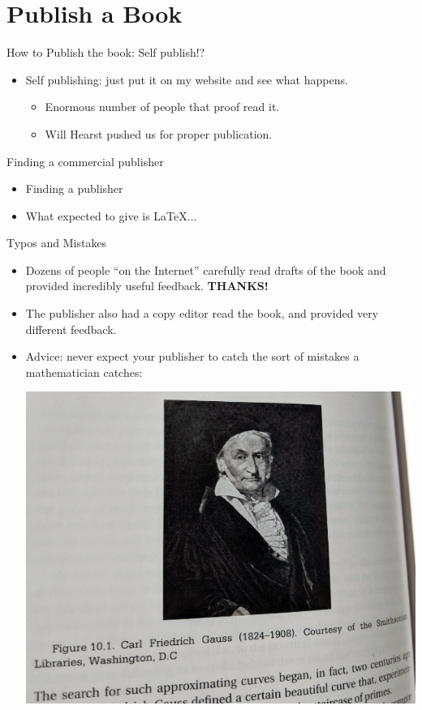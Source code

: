 \documentclass{beamer}
\begin{document}
\section{Publish a Book}

\begin{frame}{How to Publish the book:  Self publish!?}
  \begin{itemize}
    \item Self publishing: just put it on my website and see what happens.
          \begin{itemize}
            \item Enormous number of people that proof read it.
            \item Will Hearst pushed us for proper publication.
          \end{itemize}
  \end{itemize}
\end{frame}

\begin{frame}{Finding a commercial publisher}
  \begin{itemize}
    \item Finding a publisher
    \item What expected to give is \LaTeX{}...
  \end{itemize}
\end{frame}


\begin{frame}{Typos and Mistakes}
  \begin{itemize}
    \item Dozens of people ``on the Internet'' carefully read drafts of
          the book and provided incredibly useful feedback.  \textbf{THANKS!}
    \item The publisher also had a copy editor read the book,
          and provided very different feedback.
    \item Advice: never expect your publisher to catch the sort of
          mistakes a mathematician catches:
          \begin{center}
            \includegraphics[height=.45\textheight]{pics/gauss.png}
          \end{center}
  \end{itemize}
\end{frame}
\end{document}
